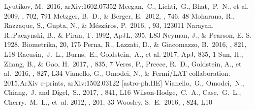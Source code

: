 \documentclass{aastex61}
\begin{document}
\begin{thebibliography}{}
 Lyutikov, M.\ 2016, arXiv:1602.07352 
 Meegan,~C., Lichti,~G., Bhat,~P.~N., et al. 2009, \apj, 702, 791
 Metzger, B.~D., \& Berger, E.\ 2012, \apj, 746, 48 
 Moharana, R., Razzaque, S., Gupta, N., \& M{\'e}sz{\'a}ros, P.\ 2016, \prd, 93, 123011 
 Narayan, R.,Paczynski, B., \& Piran, T. 1992, ApJL, 395, L83
 Neyman, J., \& Pearson, E. S. 1928, Biometrika, 20, 175
 Perna, R., Lazzati, D., \& Giacomazzo, B.\ 2016, \apjl, 821, L18 
 Racusin,~J.~L., Burns,~E., Goldstein,~A., et al. 2017, ApJ, 835, 1
 Sun, H., Zhang, B., \& Gao, H.\ 2017, \apj, 835, 7 
 Veres, P., Preece, R.~D., Goldstein, A., et al.\ 2016, \apjl, 827, L34 
 Vianello, G., Omodei, N., \& Fermi/LAT collaboration. 2015,ArXiv e-prints, arXiv:1502.03122 [astro-ph.HE]
 Vianello,~G., Omodei,~N., Chiang,~J. and Digel,~S.,  2017, \apjl, 841, L16
 Wilson-Hodge,~C.~A., Case,~G.~L., Cherry.~M.~L., et~al. 2012, \apjs, 201, 33
 Woosley, S.~E.\ 2016, \apjl, 824, L10 

\end{thebibliography}
\end{document}
